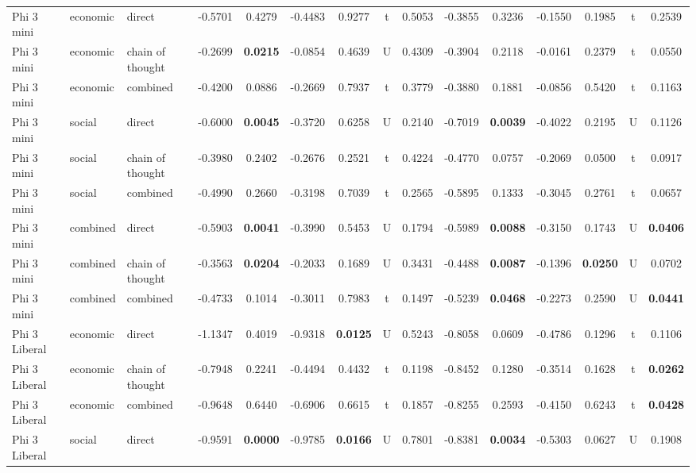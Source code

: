 \begin{center}
\begin{longtable}{@{}lll|cccccc|cccccc@{}}
\bottomrule
\endlastfoot
        Phi 3 mini & economic & direct & -0.5701 & 0.4279 & -0.4483 & 0.9277 & t & 0.5053 & -0.3855 & 0.3236 & -0.1550 & 0.1985 & t & 0.2539 \\
        Phi 3 mini & economic & chain of thought & -0.2699 & \textbf{0.0215} & -0.0854 & 0.4639 & U & 0.4309 & -0.3904 & 0.2118 & -0.0161 & 0.2379 & t & 0.0550 \\
        Phi 3 mini & economic & combined & -0.4200 & 0.0886 & -0.2669 & 0.7937 & t & 0.3779 & -0.3880 & 0.1881 & -0.0856 & 0.5420 & t & 0.1163 \\
        Phi 3 mini & social & direct & -0.6000 & \textbf{0.0045} & -0.3720 & 0.6258 & U & 0.2140 & -0.7019 & \textbf{0.0039} & -0.4022 & 0.2195 & U & 0.1126 \\
        Phi 3 mini & social & chain of thought & -0.3980 & 0.2402 & -0.2676 & 0.2521 & t & 0.4224 & -0.4770 & 0.0757 & -0.2069 & 0.0500 & t & 0.0917 \\
        Phi 3 mini & social & combined & -0.4990 & 0.2660 & -0.3198 & 0.7039 & t & 0.2565 & -0.5895 & 0.1333 & -0.3045 & 0.2761 & t & 0.0657 \\
        Phi 3 mini & combined & direct & -0.5903 & \textbf{0.0041} & -0.3990 & 0.5453 & U & 0.1794 & -0.5989 & \textbf{0.0088} & -0.3150 & 0.1743 & U & \textbf{0.0406} \\
        Phi 3 mini & combined & chain of thought & -0.3563 & \textbf{0.0204} & -0.2033 & 0.1689 & U & 0.3431 & -0.4488 & \textbf{0.0087} & -0.1396 & \textbf{0.0250} & U & 0.0702 \\
        \rowcolor{gray!20} Phi 3 mini & combined & combined & -0.4733 & 0.1014 & -0.3011 & 0.7983 & t & 0.1497 & -0.5239 & \textbf{0.0468} & -0.2273 & 0.2590 & U & \textbf{0.0441} \\
        Phi 3 Liberal & economic & direct & -1.1347 & 0.4019 & -0.9318 & \textbf{0.0125} & U & 0.5243 & -0.8058 & 0.0609 & -0.4786 & 0.1296 & t & 0.1106 \\
        Phi 3 Liberal & economic & chain of thought & -0.7948 & 0.2241 & -0.4494 & 0.4432 & t & 0.1198 & -0.8452 & 0.1280 & -0.3514 & 0.1628 & t & \textbf{0.0262} \\
        Phi 3 Liberal & economic & combined & -0.9648 & 0.6440 & -0.6906 & 0.6615 & t & 0.1857 & -0.8255 & 0.2593 & -0.4150 & 0.6243 & t & \textbf{0.0428} \\
        Phi 3 Liberal & social & direct & -0.9591 & \textbf{0.0000} & -0.9785 & \textbf{0.0166} & U & 0.7801 & -0.8381 & \textbf{0.0034} & -0.5303 & 0.0627 & U & 0.1908 \\

\end{longtable}
\end{center}
